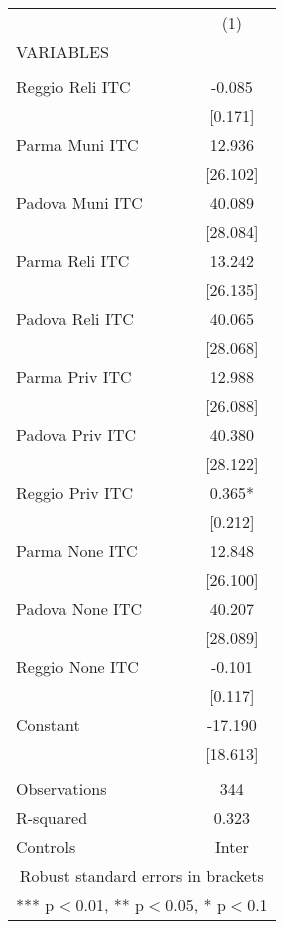 \begin{tabular}{lc} \hline
 & (1) \\
VARIABLES &  \\ \hline
 &  \\
Reggio Reli ITC & -0.085 \\
 & [0.171] \\
Parma Muni ITC & 12.936 \\
 & [26.102] \\
Padova Muni ITC & 40.089 \\
 & [28.084] \\
Parma Reli ITC & 13.242 \\
 & [26.135] \\
Padova Reli ITC & 40.065 \\
 & [28.068] \\
Parma Priv ITC & 12.988 \\
 & [26.088] \\
Padova Priv ITC & 40.380 \\
 & [28.122] \\
Reggio Priv ITC & 0.365* \\
 & [0.212] \\
Parma None ITC & 12.848 \\
 & [26.100] \\
Padova None ITC & 40.207 \\
 & [28.089] \\
Reggio None ITC & -0.101 \\
 & [0.117] \\
Constant & -17.190 \\
 & [18.613] \\
 &  \\
Observations & 344 \\
R-squared & 0.323 \\
 Controls & Inter \\ \hline
\multicolumn{2}{c}{ Robust standard errors in brackets} \\
\multicolumn{2}{c}{ *** p$<$0.01, ** p$<$0.05, * p$<$0.1} \\
\end{tabular}
